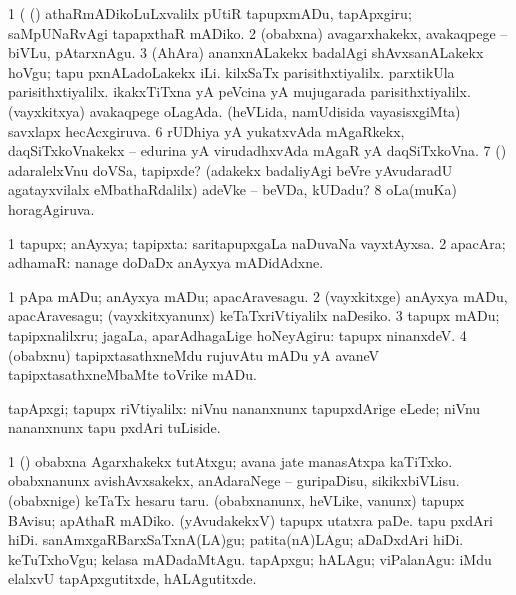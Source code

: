 \begin{center}
\noindent
\gl{\pagu}
\expl{}
\bmng
\bnum
\num{1}  (  (\rUpa) athaRmADikoLuLxvalilx pUtiR tapupxmADu, tapApxgiru; saMpUNaRvAgi tapapxthaR mADiko. 
\num{2}  (obabxna) avagarxhakekx, avakaqpege -- biVLu, pAtarxnAgu. 
\num{3}  (AhAra) ananxnALakekx badalAgi shAvxsanALakekx hoVgu; tapu pxnALadoLakekx iLi. 
  
\banum
{} kilxSaTx parisithxtiyalilx. 
 parxtikUla parisithxtiyalilx. 
 ikakxTiTxna yA peVcina yA mujugarada parisithxtiyalilx. 
\eanum
\numie
{}  
\banum
{} (vayxkitxya) avakaqpege oLagAda. 
 (heVLida, namUdisida vayasisxgiMta) savxlapx hecAcxgiruva. 
\eanum
\numie
\num{6}  rUDhiya yA yukatxvAda mAgaRkekx, daqSiTxkoVnakekx -- edurina yA virudadhxvAda mAgaR yA daqSiTxkoVna. 
\num{7}  (\AmA) adaralelxVnu doVSa, tapipxde? (adakekx badaliyAgi beVre yAvudaradU agatayxvilalx eMbathaRdalilx) adeVke -- beVDa, kUDadu? 
\num{8}  oLa(muKa) horagAgiruva. 
\enum
\emng
\eentry

\bentry
{} 
\gl{\nA}
\expl{}
\bmng
\bnum
\num{1} tapupx; anAyxya; tapipxta:  saritapupxgaLa naDuvaNa vayxtAyxsa. 
\num{2} apacAra; adhamaR:  nanage doDaDx anAyxya mADidAdxne. 
\enum
\emng

\noindent
\gl{\pagu}
\expl{}
\bmng
\bnum
\num{1}  pApa mADu; anAyxya mADu; apacAravesagu. 
\num{2}  (vayxkitxge) anAyxya mADu, apacAravesagu; (vayxkitxyanunx) keTaTxriVtiyalilx naDesiko. 
\num{3}  tapupx mADu; tapipxnalilxru; jagaLa, aparAdhagaLige hoNeyAgiru:  tapupx ninanxdeV. 
\num{4}  (obabxnu) tapipxtasathxneMdu rujuvAtu mADu yA avaneV tapipxtasathxneMbaMte toVrike mADu. 
\enum
\emng
\eentry

\bentry
{} 
\gl{\kirxvi}
\expl{}
\bmng
tapApxgi; tapupx riVtiyalilx:  niVnu nananxnunx tapupxdArige eLede; niVnu nananxnunx tapu pxdAri tuLiside. 
\emng

\noindent
\gl{\pagu}
\expl{}
\bmng
\bnum
\num{1}  (\AmA) obabxna Agarxhakekx tutAtxgu; avana jate manasAtxpa kaTiTxko. 
  
\banum
{} obabxnanunx avishAvxsakekx, anAdaraNege -- guripaDisu, sikikxbiVLisu. 
 (obabxnige) keTaTx hesaru taru. 
\eanum
\numie
{}  
\banum
{} (obabxnanunx, heVLike, \mo vanunx) tapupx BAvisu; apAthaR mADiko. 
 (yAvudakekxV) tapupx utatxra paDe. 
\eanum
\numie
{}  
\banum
{} tapu pxdAri hiDi. 
 sanAmxgaRBarxSaTxnA(LA)gu; patita(nA)LAgu; aDaDxdAri hiDi. 
 keTuTxhoVgu; kelasa mADadaMtAgu. 
 tapApxgu; hALAgu; viPalanAgu:  iMdu elalxvU tapApxgutitxde, hALAgutitxde. 
\eanum
\numie
\enum
\emng
\eentry


\end{center}
